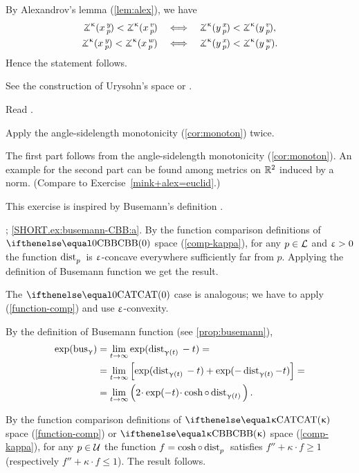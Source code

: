 By Alexandrov's lemma (\ref{lem:alex}), we have
\begin{align*}
\angk\kappa xyp<\angk\kappa xvp
\quad&\Longleftrightarrow\quad
\angk\kappa yxp<\angk\kappa yvp,
\\
\angk\kappa xyp<\angk\kappa xwp
\quad&\Longleftrightarrow\quad
\angk\kappa yxp<\angk\kappa ywp.
\end{align*}
Hence the statement follows.


See the construction of Urysohn's space \cite[3.11$\tfrac{3}{2}_+$]{gromov-MS} or \cite{petrunin2020pure}.

Read \cite{lebedeva-petrunin}.

Apply the angle-sidelength  monotonicity (\ref{cor:monoton}) twice. 

The first part follows from the angle-sidelength  monotonicity (\ref{cor:monoton}).
An example for the second part can be found among metrics on $\mathbb{R}^2$ induced by a norm. (Compare to Exercise~\ref{mink+alex=euclid}.)

 This exercise is inspired by Busemann's definition \cite{busemann-CBA}.

; \ref{SHORT.ex:busemann-CBB:a}.
By the function comparison definitions of $\Alex{0}$ space (\ref{comp-kappa}), for any $p\in \spc{L}$ and $\upvarepsilon>0$ the function $\mathop{\rm dist}\nolimits_{p}^{{}}{}{}$ is $\upvarepsilon$-concave everywhere sufficiently far from $p$.
Applying the definition of Busemann function we get the result.

The $\CAT0$ case is analogous; we have to apply (\ref{function-comp}) and use $\upvarepsilon$-convexity.

By the definition of Busemann function (see  \ref{prop:busemann}),
\begin{align*}
\exp(\bus_\gamma) 
&=  \lim_{t\to \infty} \exp(\distfun{{\gamma (t)}}{}{} - t)=
\\
&= \lim_{t\to \infty} \left[\exp (\distfun{\gamma (t)}{}{} -t)
+\exp(-\distfun{\gamma (t)}-t)\right]=
\\
&=  \lim_{t\to \infty} \left(2\cdot \exp(-t)\cdot \cosh \circ\distfun{\gamma (t)}{}{}\right).
\end{align*}

By the function comparison definitions of $\CAT\kappa$ space (\ref{function-comp}) or $\Alex{\kappa}$ space (\ref{comp-kappa}),  for any $p\in \spc{U}$ the function $f=\cosh \circ\distfun{p}{}{}$ satisfies $f''+\kappa \cdot f\ge 1$ (respectively  $f''+\kappa \cdot f\le 1$).
The result follows.

